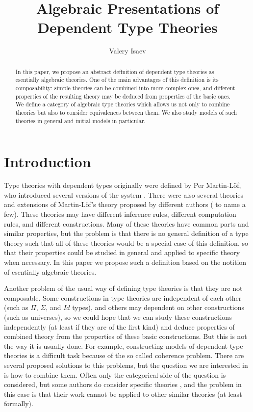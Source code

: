 \documentclass[reqno]{amsart}
\theoremstyle{definition}
\theoremstyle{remark}
\numberwithin{figure}{section}
\begin{document}
\title{Algebraic Presentations of Dependent Type Theories}

\author{Valery Isaev}

\begin{abstract}
In this paper, we propose an abstract definition of dependent type theories as esentially algebraic theories.
One of the main advantages of this definition is its composability: simple theories can be combined into more complex ones,
and different properties of the resulting theory may be deduced from properties of the basic ones.
We define a category of algebraic type theories which allows us not only to combine theories but also to consider equivalences between them.
We also study models of such theories in general and initial models in particular.
\end{abstract}

\maketitle

 \makeatletter
    \providecommand\@dotsep{5}
  \makeatother
  \listoftodos\relax

\section{Introduction}

Type theories with dependent types originally were defined by Per Martin-L\"{o}f, who introduced several versions of the system \cite{MLTT72,MLTT73,MLTT79}.
There were also several theories and extensions of Martin-L\"{o}f's theory proposed by different authors (\cite{CoC,luo94} to name a few).
These theories may have different inference rules, different computation rules, and different constructions.
Many of these theories have common parts and similar properties,
but the problem is that there is no general definition of a type theory such that all of these theories would be a special case of this definition,
so that their properties could be studied in general and applied to specific theory when necessary.
In this paper we propose such a definition based on the notition of esentially algebraic theories.

Another problem of the usual way of defining type theories is that they are not composable.
Some constructions in type theories are independent of each other (such as $\Pi$, $\Sigma$, and $Id$ types),
and others may dependent on other constructions (such as universes),
so we could hope that we can study these constructions independently (at least if they are of the first kind)
and deduce properties of combined theory from the properties of these basic constructions.
But this is not the way it is usually done.
For example, constructing models of dependent type theories is a difficult task because of the so called coherence problem.
There are several proposed solutions to this problems, but the question we are interested in is how to combine them.
Often only the categorical side of the question is considered,
but some authors do consider specific theories \cite{streicher,pitts},
and the problem in this case is that their work cannot be applied to other similar theories (at least formally).
\end{document}
